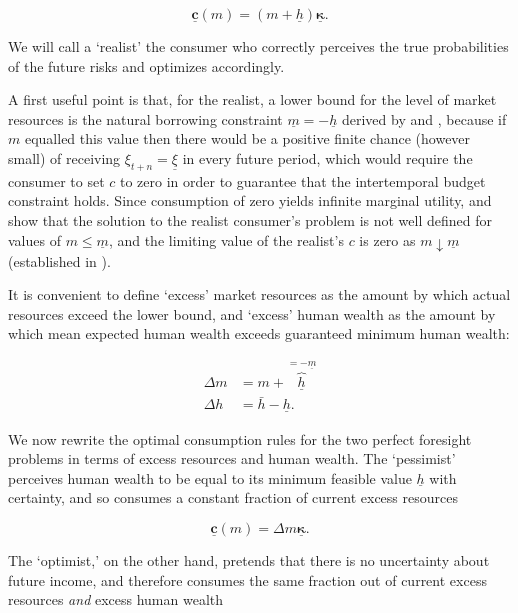 \documentclass[preprint,authoryear]{elsarticle}
\newcommand{\mNrm}{m}
\newcommand{\cNrm}{c}
\newcommand{\tranShk}{\xi}
\newcommand{\hNrm}{h}
\newcommand{\hNrmOpt}{\bar{\hNrm}}
\newcommand{\cFunc}{\mathbf{c}}
\newcommand{\MPC}{\boldsymbol{\kappa}}
\newcommand{\MPCmin}{\underline{\MPC}}
\newcommand{\hNrmPes}{\underline{\hNrm}}
\newcommand{\tranShkMin}{\underline{\tranShk}}
\newcommand{\cFuncPes}{\underline{\cFunc}}
\newcommand{\mNrmMin}{\underline{\mNrm}}
\newcommand{\mNrmEx}{\Delta \mNrm}
\newcommand{\hNrmEx}{\Delta \hNrm}
\begin{document}
\begin{equation}
\label{eq:cFuncPes}
\cFuncPes(\mNrm) = (\mNrm+\hNrmPes)\MPCmin.
\end{equation}

We will call a `realist' the consumer who correctly perceives the true probabilities of the future risks and optimizes accordingly.

A first useful point is that, for the realist, a lower bound for the level of market resources is the natural borrowing constraint $\mNrmMin = -\hNrmPes$ derived by \citet{Aiyagari1994} and \citet{Huggett1993}, because if $\mNrm$ equalled this value then there would be a positive finite chance (however small) of receiving $\tranShk_{t+n} = \tranShkMin$ in every future period, which would require the consumer to set $\cNrm$ to zero in order to guarantee that the intertemporal budget constraint holds. Since consumption of zero yields infinite marginal utility, \citet{Zeldes1989} and \citet{Deaton1991} show that the solution to the realist consumer's problem is not well defined for values of $\mNrm \leq \mNrmMin$, and the limiting value of the realist's $\cNrm$ is zero as $\mNrm \downarrow \mNrmMin$ (established in \citet{CarrollShanker2024}).

It is convenient to define `excess' market resources as the amount by which actual resources exceed the lower bound, and `excess' human wealth as the amount by which mean expected human wealth exceeds guaranteed minimum human wealth:

\begin{equation}
\label{eq:ExcessDef}
\begin{aligned}
\mNrmEx &= \mNrm+\overbrace{\hNrmPes}^{=-\mNrmMin} \\
\hNrmEx &= \hNrmOpt-\hNrmPes.
\end{aligned}
\end{equation}

We now rewrite the optimal consumption rules for the two perfect foresight problems in terms of excess resources and human wealth. The `pessimist' perceives human wealth to be equal to its minimum feasible value $\hNrmPes$ with certainty, and so consumes a constant fraction of current excess resources

\begin{equation}
\label{eq:cFuncPesExcess}
\cFuncPes(\mNrm) = \mNrmEx\MPCmin.
\end{equation}

The `optimist,' on the other hand, pretends that there is no uncertainty about future income, and therefore consumes the same fraction out of current excess resources \textit{and} excess human wealth
\end{document}
